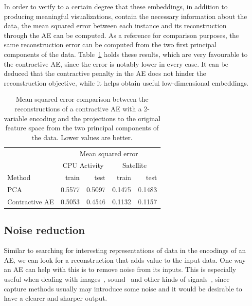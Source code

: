 \documentclass[
	fontsize=11pt, %
	twoside=false, %
	open=any, %
	secnumdepth=1, %
]{kaobook}
\begin{document}
In order to verify to a certain degree that these embeddings, in addition to producing meaningful visualizations,  contain the necessary information about the data, the mean squared error between each instance and its reconstruction through the AE can be computed. As a reference for comparison purposes, the same reconstruction error can be computed from the two first principal components of the data. Table~\ref{tbl:mse} holds these results, which are very favourable to the contractive AE, since the error is notably lower in every case. It can be deduced that the contractive penalty in the AE does not hinder the reconstruction objective, while it helps obtain useful low-dimensional embeddings.

\begin{table}[ht]
    \centering
    \begin{tabular}{lrrrr}
        \toprule
         & \multicolumn{4}{c}{Mean squared error} \\
            \cmidrule(r){2-5}
             & \multicolumn{2}{c}{CPU Activity} & \multicolumn{2}{c}{Satellite} \\
            \cmidrule(r){2-5}
            Method & train & test & train & test \\
        \midrule
            PCA & 0.5577 & 0.5097 & 0.1475 & 0.1483 \\
            Contractive AE & 0.5053 & 0.4546 & 0.1132 & 0.1157 \\
        \bottomrule               
    \end{tabular}
    \caption{\label{tbl:mse}Mean squared error comparison between the reconstructions of a contractive AE with a 2-variable encoding and the projections to the original feature space from the two principal components of the data. Lower values are better.}
\end{table}

\subsection{Noise reduction}

Similar to searching for interesting representations of data in the encodings of an AE, we can look for a reconstruction that adds value to the input data. One way an AE can help with this is to remove noise from its inputs. This is especially useful when dealing with images~\cite{xie}, sound~\cite{speech} and other kinds of signals~\cite{ecg}, since capture methods usually may introduce some noise and it would be desirable to have a clearer and sharper output.
\end{document}
